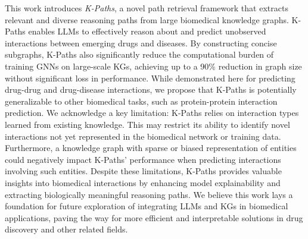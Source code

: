 This work introduces \textit{K-Paths}, a novel path retrieval framework that extracts relevant and diverse reasoning paths from large biomedical knowledge graphs.
K-Paths enables LLMs to effectively reason about and predict unobserved interactions between emerging drugs and diseases. 
By constructing concise subgraphs, K-Paths also significantly reduce the computational burden of training GNNs on large-scale KGs, achieving up to a 90\% reduction in graph size without significant loss in performance.
While demonstrated here for predicting drug-drug and drug-disease interactions, we propose that K-Paths is potentially generalizable to other biomedical tasks, such as protein-protein interaction prediction.
We acknowledge a key limitation: K-Paths relies on interaction types learned from existing knowledge.
This may restrict its ability to identify novel interactions not yet represented in the biomedical network or training data.
Furthermore, a knowledge graph with sparse or biased representation of entities could negatively impact K-Paths' performance when predicting interactions involving such entities.
Despite these limitations, K-Paths provides valuable insights into biomedical interactions by enhancing model explainability and extracting biologically meaningful reasoning paths.
We believe this work lays a foundation for future exploration of integrating LLMs and KGs in biomedical applications, paving the way for more efficient and interpretable solutions in drug discovery and other related fields.